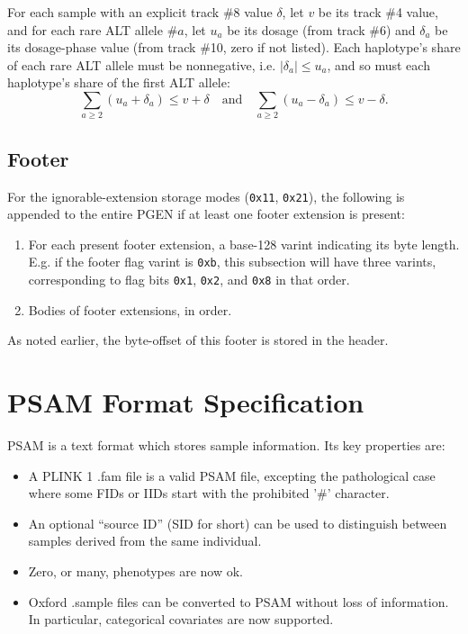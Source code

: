 \documentclass[8pt]{article}
\begin{document}
For each sample with an explicit track \#8 value $\delta$, let $v$ be its track
\#4 value, and for each rare ALT allele \#$a$, let $u_a$ be its dosage (from
track \#6) and $\delta_a$ be its dosage-phase value (from track \#10, zero if
not listed).  Each haplotype's share of each rare ALT allele must be
nonnegative, i.e. $|\delta_a|\leq u_a$, and so must each haplotype's share of
the first ALT allele:
\[
\sum_{a\geq 2} (u_a + \delta_a) \leq v + \delta \quad\textrm{and}\quad
\sum_{a\geq 2} (u_a - \delta_a) \leq v - \delta .
\]

\subsection{Footer}

For the ignorable-extension storage modes (\texttt{0x11}, \texttt{0x21}), the
following is appended to the entire PGEN if at least one footer extension is
present:

\begin{enumerate}
\item For each present footer extension, a base-128 varint indicating its byte
  length.  E.g. if the footer flag varint is \texttt{0xb}, this subsection will
  have three varints, corresponding to flag bits \texttt{0x1}, \texttt{0x2},
  and \texttt{0x8} in that order.
\item Bodies of footer extensions, in order.
\end{enumerate}

As noted earlier, the byte-offset of this footer is stored in the header.

\newpage
\section{PSAM Format Specification}

PSAM is a text format which stores sample information.  Its key properties are:

\begin{itemize}
\item A PLINK 1 .fam file is a valid PSAM file, excepting the pathological case
  where some FIDs or IIDs start with the prohibited '\#' character.
\item An optional ``source ID'' (SID for short) can be used to distinguish
  between samples derived from the same individual.
\item Zero, or many, phenotypes are now ok.
\item Oxford .sample files can be converted to PSAM without loss of
  information.  In particular, categorical covariates are now supported.
\end{itemize}
\end{document}
